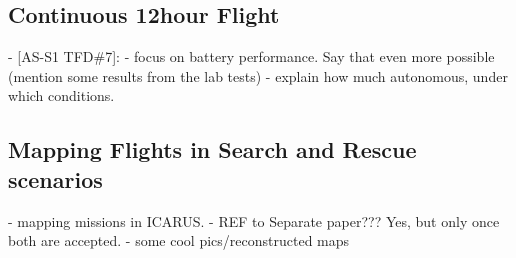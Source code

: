 \subsection{Continuous 12hour Flight}
  
   - [AS-S1 TFD\#7]:
   - focus on battery performance. Say that even more possible (mention some results from the lab tests)
   - explain how much autonomous, under which conditions.
  
\subsection{Mapping Flights in Search and Rescue scenarios}
   
    - mapping missions in ICARUS. 
    - REF to Separate paper??? Yes, but only once both are accepted.
    - some cool pics/reconstructed maps